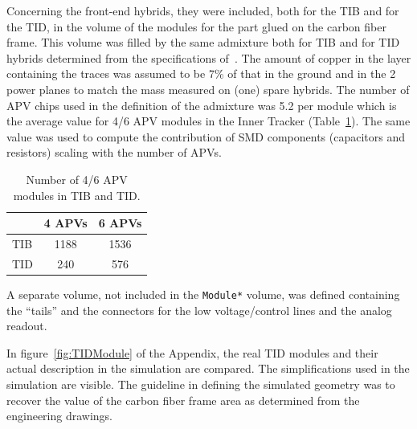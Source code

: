 \documentclass{cmspaper}
\begin{document}
Concerning the front-end hybrids, they were included, both for the TIB
and for the TID, in the volume of the modules for the part glued on
the carbon fiber frame.  
This volume was filled by the same admixture both for TIB and for TID
hybrids determined from the specifications of~\cite{hybrid}.
The amount of copper in the layer containing the traces was assumed to
be 7\% of that in the ground and in the 2 power planes to match the mass
measured on (one) spare hybrids. 
The number of APV chips used in the definition of the admixture was
5.2 per module which is the average value for 4/6 APV modules in the
Inner Tracker (Table~\ref{tab:apv}). The same value was used to compute the
contribution of SMD components (capacitors and resistors) scaling with the
number of APVs. 
\begin{table}[h!]
  \caption{Number of 4/6 APV modules in TIB and TID.}
  \label{tab:apv}
  \begin{center}
    \begin{tabular}{lcc}
      & 4 APVs & 6 APVs \\
      \hline
      TIB& 1188& 1536 \\
      TID&  240&  576 \\
      \hline
    \end{tabular}
  \end{center}
\end{table}
A separate volume, not included in the {\tt *Module*} volume, was
defined containing the ``tails'' and the connectors for the low
voltage/control lines and the analog readout.  

In figure~\ref{fig:TIDModule} of the Appendix, the real TID modules and their actual description in
the simulation are compared. The simplifications used in the simulation
are visible. The guideline in defining the simulated geometry
was to recover the value of the carbon fiber frame area as determined from the
engineering drawings. 
\end{document}
